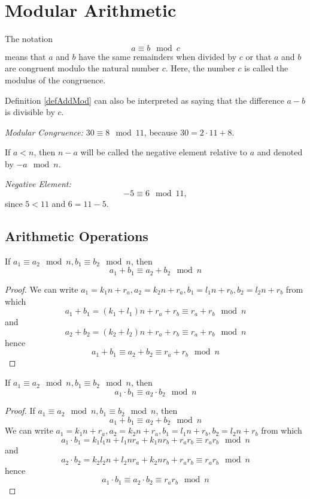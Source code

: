 \section{Modular Arithmetic}
\begin{definition}
The notation
\begin{equation}
a \equiv b \mod{c}
\label{defAddMod}
\end{equation}
means that $a$ and $b$ have the same remainders when divided by $c$
or that $a$ and $b$ are congruent modulo the natural number $c$. Here,
the number $c$ is called the modulus of the congruence.
\end{definition}

Definition \ref{defAddMod} can also be interpreted as saying that
the difference $a - b$ is divisible by $c$.

\begin{example}
\emph{Modular Congruence:}
$30 \equiv 8 \mod{11}$, because $30 = 2 \cdot 11 + 8$.
\end{example}

\begin{definition}
If $a < n$, then $n - a$ will be called the negative element relative to
$a$ and denoted by $-a \mod n$.
\end{definition}

\begin{example}
\emph{Negative Element:}
\[
-5 \equiv 6 \mod 11,
\]
since $5 < 11$ and $6 = 11 - 5$.
\end{example}


\subsection{Arithmetic Operations}

\begin{lemma}
If $a_1 \equiv a_2 \mod n, b_1 \equiv b_2 \mod n$, then 
\[
a_1 + b_1 \equiv a_2 + b_2 \mod n
\]
\begin{proof}
We can write $a_1 = k_1 n + r_a, a_2 = k_2 n + r_a, b_1 = l_1 n +
r_b, b_2 = l_2 n + r_b$ from which
\[
a_1 + b_1 = (k_1 + l_1) n + r_a + r_b \equiv r_a + r_b \mod n
\] 
and
\[
a_2 + b_2 = (k_2 + l_2) n + r_a + r_b \equiv r_a + r_b \mod n
\] 
hence
\[
a_1 + b_1 \equiv a_2 + b_2 \equiv r_a + r_b \mod n
\]
\end{proof}
\end{lemma}

\begin{lemma}
If $a_1 \equiv a_2 \mod n, b_1 \equiv b_2 \mod n$, then 
\[
a_1 \cdot b_1 \equiv a_2 \cdot b_2 \mod n
\]
\begin{proof}
If $a_1 \equiv a_2 \mod n, b_1 \equiv b_2 \mod n$, then 
\[
a_1 + b_1 \equiv a_2 + b_2 \mod n
\]
We can write $a_1 = k_1 n + r_a, a_2 = k_2 n + r_a, b_1 = l_1 n +
r_b, b_2 = l_2 n + r_b$ from which
\[
a_1 \cdot b_1 = k_1 l_1 n + l_1 n r_a + k_1 n r_b + r_a r_b \equiv r_a r_b \mod n
\] 
and
\[
a_2 \cdot b_2 = k_2 l_2 n + l_2 n r_a + k_2 n r_b + r_a r_b \equiv r_a r_b \mod n
\] 
hence
\[
a_1 \cdot b_1 \equiv a_2 \cdot  b_2 \equiv r_a r_b \mod n
\]
\end{proof}
\end{lemma}

